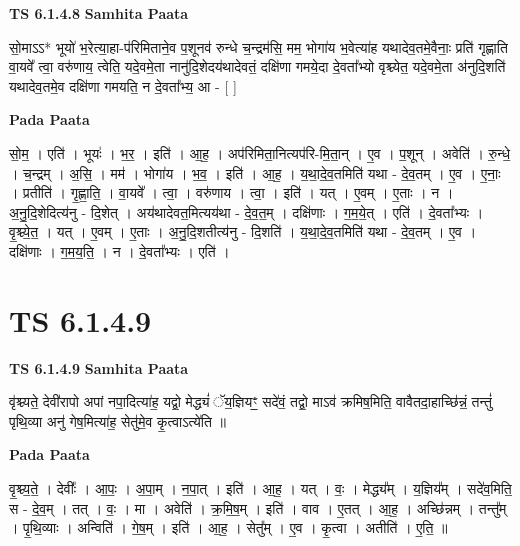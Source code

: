 \documentclass[17pt]{extarticle}
\begin{document}
\textbf{TS 6.1.4.8 } \newline
\textbf{Samhita Paata} \newline

सो॒माऽऽ* भूयो॑ भ॒रेत्या॒हा-प॑रिमिताने॒व प॒शूनव॑ रुन्धे च॒न्द्रम॑सि॒ मम॒ भोगा॑य भ॒वेत्या॑ह यथादेव॒तमे॒वैनाः॒ प्रति॑ गृह्णाति वा॒यवे᳚ त्वा॒ वरु॑णाय॒ त्वेति॒ यदे॒वमे॒ता नानु॑दि॒शेदय॑थादेवतं॒ दक्षि॑णा गमये॒दा दे॒वता᳚भ्यो वृश्च्येत॒ यदे॒वमे॒ता अ॑नुदि॒शति॑ यथादेव॒तमे॒व दक्षि॑णा गमयति॒ न दे॒वता᳚भ्य॒ आ - [  ] \newline

\textbf{Pada Paata} \newline

सो॒म॒ । एति॑ । भूयः॑ । भ॒र॒ । इति॑ । आ॒ह॒ । अप॑रिमिता॒नित्यप॑रि-मि॒ता॒न् । ए॒व । प॒शून् । अवेति॑ । रु॒न्धे॒ । च॒न्द्रम् । अ॒सि॒ । मम॑ । भोगा॑य । भ॒व॒ । इति॑ । आ॒ह॒ । य॒था॒दे॒व॒तमिति॑ यथा - दे॒व॒तम् । ए॒व । ए॒नाः॒ । प्रतीति॑ । गृ॒ह्णा॒ति॒ । वा॒यवे᳚ । त्वा॒ । वरु॑णाय । त्वा॒ । इति॑ । यत् । ए॒वम् । ए॒ताः । न । अ॒नु॒दि॒शेदित्य॑नु - दि॒शेत् । अय॑थादेवत॒मित्यय॑था - दे॒व॒त॒म् । दक्षि॑णाः । ग॒म॒ये॒त् । एति॑ । दे॒वता᳚भ्यः । वृ॒श्च्ये॒त॒ । यत् । ए॒वम् । ए॒ताः । अ॒नु॒दि॒शतीत्य॑नु - दि॒शति॑ । य॒था॒दे॒व॒तमिति॑ यथा - दे॒व॒तम् । ए॒व । दक्षि॑णाः । ग॒म॒य॒ति॒ । न । दे॒वता᳚भ्यः । एति॑ ।  \newline





\section{ TS 6.1.4.9 }

\textbf{TS 6.1.4.9 } \newline
\textbf{Samhita Paata} \newline

वृ॑श्च्यते॒ देवी॑रापो अपां नपा॒दित्या॑ह॒ यद्वो॒ मेद्ध्यं॑ ॅय॒ज्ञियꣳ॒॒ सदे॑वं॒ तद्वो॒ माऽव॑ क्रमिष॒मिति॒ वावैतदा॒हाच्छि॑न्नं॒ तन्तुं॑ पृथि॒व्या अनु॑ गेष॒मित्या॑ह॒ सेतु॑मे॒व कृ॒त्वाऽत्ये॑ति ॥ \newline

\textbf{Pada Paata} \newline

वृ॒श्च्य॒ते॒ । देवीः᳚ । आ॒पः॒ । अ॒पा॒म् । न॒पा॒त् । इति॑ । आ॒ह॒ । यत् । वः॒ । मेद्ध्य᳚म् । य॒ज्ञिय᳚म् । सदे॑व॒मिति॒ स - दे॒व॒म् । तत् । वः॒ । मा । अवेति॑ । क्र॒मि॒ष॒म् । इति॑ । वाव । ए॒तत् । आ॒ह॒ । अच्छि॑न्नम् । तन्तु᳚म् । पृ॒थि॒व्याः । अन्विति॑ । गे॒ष॒म् । इति॑ । आ॒ह॒ । सेतु᳚म् । ए॒व । कृ॒त्वा । अतीति॑ । ए॒ति॒ ॥  \newline
\end{document}
